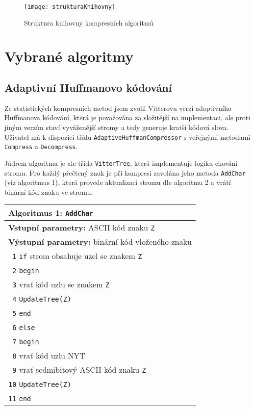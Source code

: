 \begin{figure}[!h]
\centering
\texttt{[image: strukturaKnihovny]}
\caption{Struktura knihovny kompresních algoritmů}
\label{strukturaKnihovny}
\end{figure}


\section{Vybrané algoritmy}
\subsection{Adaptivní Huffmanovo kódování}
Ze statistických kompresních metod jsem zvolil Vitterovu verzi adaptivního Huffmanova kódování, která je považována za složitější na implementaci, ale proti jiným verzím staví vyváženější stromy a tedy generuje kratší kódová slova. Uživatel má k dispozici třídu \texttt{AdaptiveHuffmanCompressor} s veřejnými metodami \texttt{Compress} a \texttt{Decompress}. 

Jádrem algoritmu je ale třída \texttt{VitterTree}, která implementuje logiku chování stromu. Pro každý přečtený znak je při kompresi zavolána jeho metoda \texttt{AddChar} (viz algoritmus 1), která provede aktualizaci stromu dle algoritmu 2 a vrátí binární kód znaku ve stromu.

\begin{table}[!h]
\centering
\begin{tabular}{|l|}
\hline
\textbf{Algoritmus 1:} \texttt{AddChar}\\
\hline
\textbf{Vstupní parametry:} ASCII kód znaku \texttt{Z}\\
\textbf{Výstupní parametry:} binární kód vloženého znaku\\
\hline
\texttt{ 1} \texttt{if} strom obsahuje uzel se znakem \texttt{Z}\\
\texttt{ 2} \texttt{begin}\\
\texttt{ 3} \hspace*{5mm}vrať kód uzlu se znakem \texttt{Z}\\
\texttt{ 4} \hspace*{5mm}\texttt{UpdateTree(\texttt{Z})}\\
\texttt{ 5} \texttt{end}\\
\texttt{ 6} \texttt{else}\\
\texttt{ 7} \texttt{begin}\\
\texttt{ 8} \hspace*{5mm}vrať kód uzlu NYT\\
\texttt{ 9} \hspace*{5mm}vrať sedmibitový ASCII kód znaku \texttt{Z}\\
\texttt{10} \hspace*{5mm}\texttt{UpdateTree(\texttt{Z})}\\
\texttt{11} \texttt{end}\\
\hline
\end{tabular}
\end{table}

